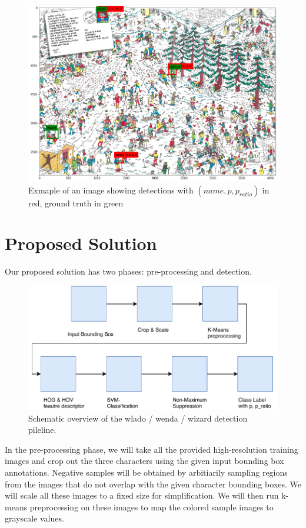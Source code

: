 \documentclass[11pt]{article}
\begin{document}
\begin{figure}
    \centering
    \includegraphics[width=0.9\linewidth]{figures/waldo_winter} 
    \caption{Exmaple of an image showing detections with \( (name, p, p_{ratio}) \) in red, ground truth in green}
    \label{fig:waldo-winter}
\end{figure}

\section{Proposed Solution}
Our proposed solution has two phases: pre-processing and detection.

\begin{figure}
    \centering
    \includegraphics[width=0.9\linewidth]{figures/model_overview} 
    \caption{Schematic overview of the wlado / wenda / wizard detection pileline.}
    \label{fig:model-overview}
\end{figure}

In the pre-processing phase, we will take all the provided high-resolution training images and crop out the three characters using the given input bounding box annotations. Negative samples will be obtained by arbitiarily sampling regions from the images that do not overlap with the given character bounding boxes. We will scale all these images to a fixed size for simplification. We will then run k-means preprocessing on these images to map the colored sample images to grayscale values.
\end{document}
